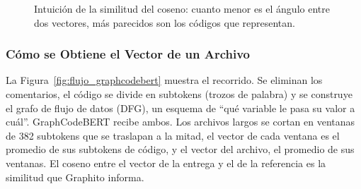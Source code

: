 \begin{figure}[H]
    \centering
    \caption{Intuición de la similitud del coseno: cuanto menor es el ángulo entre dos vectores, más parecidos son los códigos que representan.}
    \label{fig:coseno_intuicion}
\end{figure}

\subsubsection{Cómo se Obtiene el Vector de un Archivo}
La Figura~\ref{fig:flujo_graphcodebert} muestra el recorrido. Se eliminan los comentarios, el código se divide en subtokens (trozos de palabra) y se construye el grafo de flujo de datos (DFG), un esquema de ``qué variable le pasa su valor a cuál''. GraphCodeBERT recibe ambos. Los archivos largos se cortan en ventanas de 382 subtokens que se traslapan a la mitad, el vector de cada ventana es el promedio de sus subtokens de código, y el vector del archivo, el promedio de sus ventanas. El coseno entre el vector de la entrega y el de la referencia es la similitud que Graphito informa.

